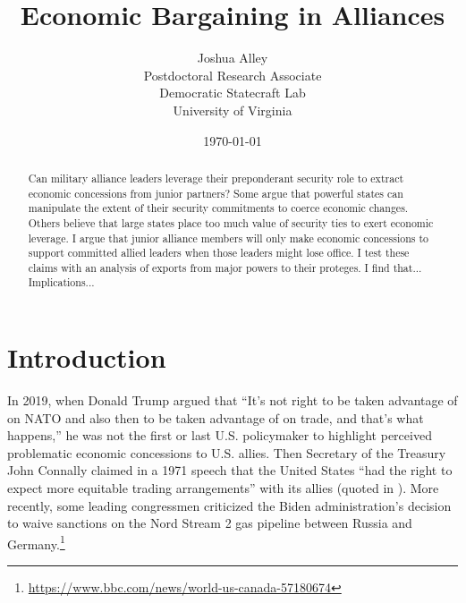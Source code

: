 \documentclass[12pt]{article}
\title{\textbf{Economic Bargaining in Alliances}}
\author{
Joshua Alley\\
Postdoctoral Research Associate\\
Democratic Statecraft Lab\\
University of Virginia 
}
\date{\today}
\begin{document}
\maketitle 

\begin{abstract}
Can military alliance leaders leverage their preponderant security role to extract economic concessions from junior partners?
Some argue that powerful states can manipulate the extent of their security commitments to coerce economic changes. 
Others believe that large states place too much value of security ties to exert economic leverage.  
I argue that junior alliance members will only make economic concessions to support committed allied leaders when those leaders might lose office. 
I test these claims with an analysis of exports from major powers to their proteges. 
I find that...
Implications...
\end{abstract} 


\newpage 
\doublespace 


\section{Introduction}

In 2019, when Donald Trump argued that ``It's not right to be taken advantage of on NATO and also then to be taken advantage of on trade, and that's what happens,'' he was not the first or last U.S. policymaker to highlight perceived problematic economic concessions to U.S. allies.
Then Secretary of the Treasury John Connally claimed in a 1971 speech that the United States ``had the right to expect more equitable trading arrangements'' with its allies (quoted in \citep[pg 175]{Sayle2019}).
More recently, some leading congressmen criticized the Biden administration's decision to waive sanctions on the Nord Stream 2 gas pipeline between Russia and Germany.\footnote{\url{https://www.bbc.com/news/world-us-canada-57180674}}
\end{document}
